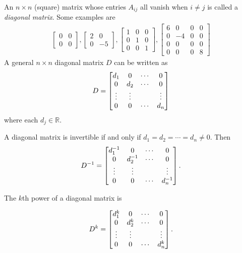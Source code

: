 \documentclass[12pt,letterpaper,reqno]{article}
\numberwithin{equation}{section}
\newcommand{\ti}[1]{\textit{#1}}
\begin{document}
An $n \times n$ (square) matrix whose entries $A_{ij}$ all vanish when $i \neq j$ is called a \ti{diagonal matrix}. Some examples are
\begin{align*}
	\begin{bmatrix}
		0 & 0\\ 0 & 0
	\end{bmatrix}, \begin{bmatrix}
		2 & 0 \\ 0 & -5
	\end{bmatrix}, \begin{bmatrix}
		1 & 0 & 0 \\ 0 & 1 & 0 \\ 0 & 0 & 1
	\end{bmatrix}, \begin{bmatrix}
		6 & 0 & 0 & 0 \\ 0 & -4 & 0 & 0 \\ 0 & 0 & 0 & 0 \\ 0 & 0 & 0 & 8
	\end{bmatrix}
\end{align*}
A general $n \times n$ diagonal matrix $D$ can be written as 
\begin{equation}\label{eq:diagonal_matrix}
	D=\begin{bmatrix}
		d_1 & 0 & \cdots & 0 \\
		0 & d_2 & \cdots & 0 \\
		\vdots & \vdots & \hspace{0.25cm} & \vdots \\
		0 & 0 & \cdots & d_n
	\end{bmatrix}
\end{equation}
where each $d_j \in \mathbb{R}$.

A diagonal matrix is invertible if and only if $d_1=d_2=\cdots=d_n \neq 0$. Then
\begin{equation}\label{eq:inverse_diagonal_matrix}
	D^{-1}=\begin{bmatrix}
		d_1^{-1} & 0 & \cdots & 0 \\
		0 & d_2^{-1} & \cdots & 0 \\
		\vdots & \vdots & \hspace{0.25cm} & \vdots \\
		0 & 0 & \cdots & d_n^{-1}
	\end{bmatrix}.
\end{equation}

The $k$th power of a diagonal matrix is

\begin{equation}\label{eq:inverse_diagonal_matrix}
	D^k=\begin{bmatrix}
		d_1^k & 0 & \cdots & 0 \\
		0 & d_2^k & \cdots & 0 \\
		\vdots & \vdots & \hspace{0.25cm} & \vdots \\
		0 & 0 & \cdots & d_n^k
	\end{bmatrix}.
\end{equation}
\end{document}
